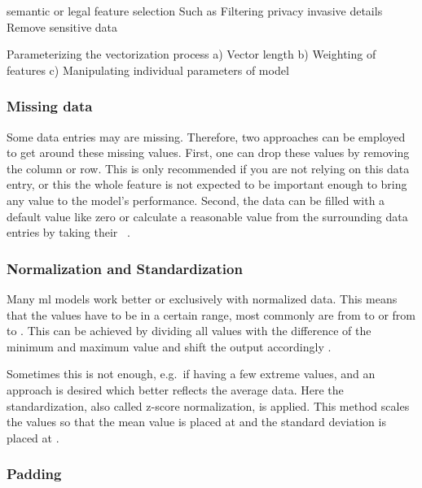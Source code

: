 semantic or legal feature selection
Such as Filtering privacy invasive details
Remove sensitive data

Parameterizing the vectorization process
a) Vector length
b) Weighting of features
c) Manipulating individual parameters of model

\subsubsection{Missing data}
Some data entries may are missing.
Therefore, two approaches can be employed to get around these missing values.
First, one can drop these values by removing the column or row.
This is only recommended if you are not relying on this data entry, or this the whole feature is not expected to be important enough to bring any value to the model's performance.
Second, the data can be filled with a default value like zero or calculate a reasonable value from the surrounding data entries by taking their ~\cite{duong2021}.

\subsubsection{Normalization and Standardization}

Many \gls{ml} models work better or exclusively with normalized data.
This means that the values have to be in a certain range, most commonly are from  to  or from  to .
This can be achieved by dividing all values with the difference of the minimum and maximum value and shift the output accordingly \cite{duong2021}.


Sometimes this is not enough, e.g.\ if having a few extreme values, and an approach is desired which better reflects the average data.
Here the standardization, also called z-score normalization, is applied.
This method scales the values so that the mean value is placed at  and the standard deviation is placed at .

\subsubsection{Padding}
\label{subsubsec:padding}

